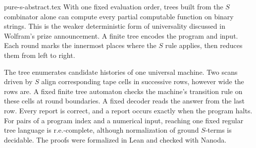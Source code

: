 \begin{filecontents*}[overwrite]{pure-s-abstract.tex}
With one fixed evaluation order, trees built from the $S$ combinator alone can compute every partial computable function on binary strings. This is the weaker deterministic form of universality discussed in Wolfram's prize announcement. A finite tree encodes the program and input. Each round marks the innermost places where the $S$ rule applies, then reduces them from left to right.

The tree enumerates candidate histories of one universal machine. Two scans driven by $S$ align corresponding tape cells in successive rows, however wide the rows are. A fixed finite tree automaton checks the machine's transition rule on these cells at round boundaries. A fixed decoder reads the answer from the last row. Every report is correct, and a report occurs exactly when the program halts. For pairs of a program index and a numerical input, reaching one fixed regular tree language is r.e.-complete, although normalization of ground $S$-terms is decidable. The proofs were formalized in Lean and checked with Nanoda.
\end{filecontents*}
